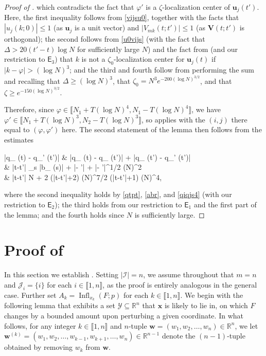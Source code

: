 \documentclass{amsart}
\numberwithin{equation}{section}
\DeclareMathOperator{\Infl}{Infl}
\theoremstyle{remark}
\theoremstyle{definition}
\begin{document}
\begin{proof}[Proof of ]
		\noindent which contradicts the fact that $\varphi'$ is a $\zeta$-localization center of $\bm{u}_j (t')$. Here, the first inequality follows from \eqref{vijsu0}, together with the facts that $| u_j (k; 0) | \le 1$ (as $\bm{u}_j$ is a unit vector) and $| V_{mk} (t; t') | \le 1$ (as $\bm{V} (t; t')$ is orthogonal); the second follows from \eqref{u0vijs} (with the fact that $\Delta > 20 (t'-t) \log N $ for sufficiently large $N$) and the fact from  (and our restriction to $\mathsf{E}_3$) that $k$ is not a $\zeta_0$-localization center for $\bm{u}_j (t)$ if $|k-\varphi| > (\log N)^3$; and the third and fourth follow from performing the sum and recalling that $\Delta \ge (\log N)^3$, that $\zeta_0 = N^3 e^{-200 (\log N)^{3/2}}$, and that $\zeta \ge e^{-150 (\log N)^{3/2}}$.
		
		Therefore, since $\varphi \in \llbracket N_1 + T (\log N)^4, N_1 - T (\log N)^4 \rrbracket$, we have $\varphi' \in \llbracket N_1 + T(\log N)^3, N_2 - T(\log N)^3 \rrbracket$, so  applies with the $(i, j)$ there equal to $(\varphi, \varphi')$ here. The second statement of the lemma then follows from the estimates  
		\begin{flalign*}
			|q_{\varphi} (t) - q_{\varphi'} (t')| & \le  |q_{\varphi} (t) - q_{\varphi} (t')| + |q_{\varphi} (t') - q_{\varphi'} (t')| \\
			& \le |t-t'| \cdot \displaystyle\sup_{s \in [0, T]} |b_{\varphi} (s)| + \alpha \cdot |\varphi - \varphi'| + |\varphi - \varphi'|^{1/2} (\log N)^2 \\
			& \le |t-t'| \cdot \log N + 2 \alpha (|t-t'|+2) (\log N)^{7/2} \le (|t-t'|+1) (\log N)^4,
		\end{flalign*}
		
		\noindent where the second inequality holds by \eqref{qtpt}, \eqref{abr}, and \eqref{qiqjs4} (with our restriction to $\mathsf{E}_2$); the third holds from our restriction to $\mathsf{E}_1$ and the first part of the lemma; and the fourth holds since $N$ is sufficiently large.		
	\end{proof} 
	
	
	\section{Proof of }
	
	\label{Proofxf}
	
	In this section we establish . Setting $|\mathcal{I}| = n$, we assume throughout that $m = n$ and $\mathcal{J}_i = \{ i \}$ for each $i \in \llbracket 1, n \rrbracket$, as the proof is entirely analogous in the general case. Further set $A_k = \Infl_{x_k} (F;p)$ for each $k \in \llbracket 1, n \rrbracket$. We begin with the following lemma that exhibits a set $\mathcal{Y} \subseteq \mathbb{R}^n$ that $\bm{x}$ is likely to lie in, on which $F$ changes by a bounded amount upon perturbing a given coordinate. In what follows, for any integer $k \in \llbracket 1, n \rrbracket$ and $n$-tuple $\bm{w} = (w_1, w_2, \ldots , w_n) \in \mathbb{R}^n$, we let $\bm{w}^{(k)} = (w_1, w_2, \ldots , w_{k-1}, w_{k+1}, \ldots , w_n) \in \mathbb{R}^{n-1}$ denote the $(n-1)$-tuple obtained by removing $w_k$ from $\bm{w}$. 
	
\end{document}
